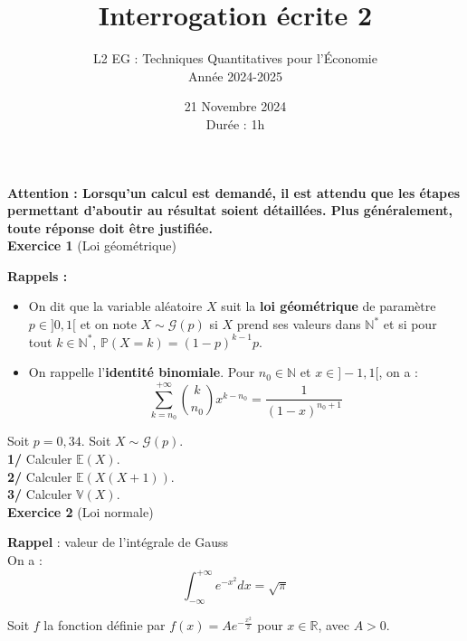 \documentclass[a4paper,12pt]{article}
\title{Interrogation écrite 2}
\author{L2 EG : Techniques Quantitatives pour l'Économie \\ Année 2024-2025}
\date{21 Novembre 2024 \\
Durée : 1h}
\newcommand{\E}{\mathbb{E}}
\newcommand{\prob}{\mathbb{P}}
\begin{document}
\maketitle

\textbf{Attention : Lorsqu'un calcul est demandé, il est attendu que les étapes permettant d'aboutir au résultat soient détaillées. Plus généralement, toute réponse doit être justifiée.} \\

\textbf{Exercice 1} (Loi géométrique) \\

\begin{tcolorbox}[colframe=black, colback=white, sharp corners, width=\textwidth, boxrule=0.5mm]
\textbf{Rappels :}\\
\begin{itemize}
    \item On dit que la variable aléatoire $X$ suit la \textbf{loi géométrique} de paramètre $p \in ]0,1[$ et on note $X \sim \mathcal{G} (p)$ si $X$ prend ses valeurs dans $\mathbb{N}^*$ et si pour tout $k \in \mathbb{N}^*$, $\prob (X=k) = (1-p)^{k-1} p$. \\

\item On rappelle l'\textbf{identité binomiale}. Pour $n_0 \in \mathbb{N}$ et $x \in ]-1,1[$, on a :
$$\sum_{k=n_0}^{+\infty} \binom{k}{n_0} x^{k-n_0} = \frac{1}{(1-x)^{n_0+1}}$$

\end{itemize}
\end{tcolorbox}


Soit $p=0,34$. Soit $X \sim \mathcal{G} (p)$. \\

\textbf{1/} Calculer $\E (X)$. \\

\textbf{2/} Calculer $\E (X(X+1))$. \\

\textbf{3/} Calculer $\mathbb{V} (X)$. \\

\textbf{Exercice 2} (Loi normale) \\

\begin{tcolorbox}[colframe=black, colback=white, sharp corners, width=\textwidth, boxrule=0.5mm]
\textbf{Rappel} : valeur de l'intégrale de Gauss \\
On a :
$$\int_{- \infty}^{+ \infty} e^{-x^2} dx = \sqrt{\pi}$$
\end{tcolorbox}
Soit $f$ la fonction définie par $f(x)=Ae^{-\frac{x^2}{2}}$ pour $x \in \mathbb{R}$, avec $A>0$. 
\end{document}

